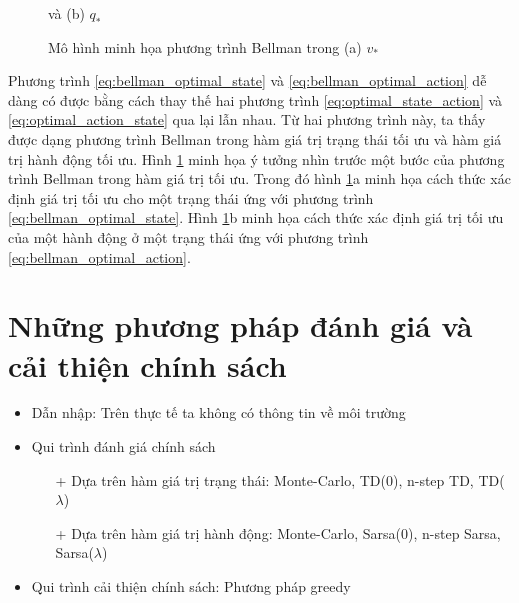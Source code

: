 \begin{figure}
		\caption[Đồ thị minh họa phương trình Bellman trong hàm giá trị tối ưu]{Mô hình minh họa phương trình Bellman trong (a) $v_{*}$} và (b) $q_{*}$
		\label{fig:bellman_optimal_function}
	\end{figure}
	
	Phương trình \ref{eq:bellman_optimal_state} và \ref{eq:bellman_optimal_action} dễ dàng có được bằng cách thay thế hai phương trình \ref{eq:optimal_state_action} và \ref{eq:optimal_action_state} qua lại lẫn nhau. Từ hai phương trình này, ta thấy được dạng phương trình Bellman trong hàm giá trị trạng thái tối ưu và hàm giá trị hành động tối ưu. Hình \ref{fig:bellman_optimal_function} minh họa ý tưởng nhìn trước một bước của phương trình Bellman trong hàm giá trị tối ưu. Trong đó hình \ref{fig:bellman_optimal_function}a minh họa cách thức xác định giá trị tối ưu cho một trạng thái ứng với phương trình \ref{eq:bellman_optimal_state}. Hình \ref{fig:bellman_optimal_function}b minh họa cách thức xác định giá trị tối ưu của một hành động ở một trạng thái ứng với phương trình \ref{eq:bellman_optimal_action}.
	
\section{Những phương pháp đánh giá và cải thiện chính sách}
	\begin{itemize}
		\item Dẫn nhập: Trên thực tế ta không có thông tin về môi trường
		\item Qui trình đánh giá chính sách
			\begin{itemize}
				\item[+] Dựa trên hàm giá trị trạng thái: Monte-Carlo, TD(0), n-step TD, TD($\lambda$)
				\item[+] Dựa trên hàm giá trị hành động: Monte-Carlo, Sarsa(0), n-step Sarsa, Sarsa($\lambda$)
			\end{itemize}
		\item Qui trình cải thiện chính sách: Phương pháp greedy
	\end{itemize}
	
	
